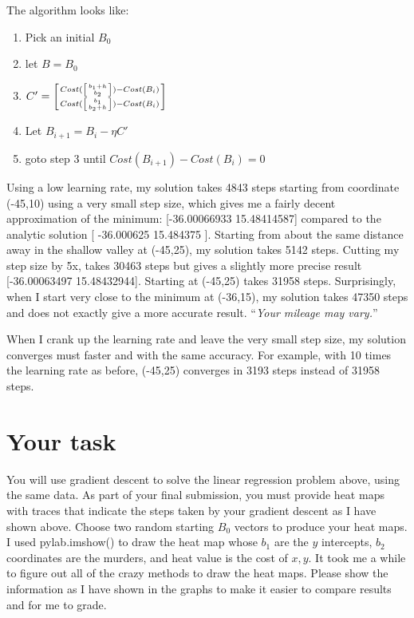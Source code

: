 \begin{fullwidth}
The algorithm looks like:

\begin{enumerate}
\item Pick an initial $B_0$
\item let $B = B_0$
\item $C' = \left[ Cost(\left[ b_1+h \above 0pt{b_2} \right]) - Cost(B_i) \above 0pt Cost(\left[ b_1 \above 0pt{b_2+h} \right]) - Cost(B_i) \right]$
\item Let $B_{i+1} = B_i - \eta C'$
\item goto step 3 until $Cost(B_{i+1})-Cost(B_i)=0$
\end{enumerate}

Using a low learning rate, my solution takes 4843 steps starting from coordinate (-45,10) using a very small step size, which gives me a fairly decent approximation of the minimum: [-36.00066933  15.48414587] compared to the analytic solution [ -36.000625 15.484375 ]. Starting from about the same distance away in the shallow valley at (-45,25), my solution takes 5142 steps. Cutting my step size by 5x, takes 30463 steps but gives a slightly more precise result [-36.00063497  15.48432944]. Starting at (-45,25) takes 31958 steps. Surprisingly, when I start very close to the minimum at (-36,15), my solution takes 47350 steps and does not exactly give a more accurate result. ``{\em Your mileage may vary.}''

\noindent {}

\noindent {}

When I crank up the learning rate and leave the very small step size, my solution converges must faster and with the same accuracy. For example, with 10 times the learning rate as before, (-45,25) converges in 3193 steps instead of 31958 steps.

\section{Your task}

You will use gradient descent to solve the linear regression problem above, using the same data. As part of your final submission, you must provide heat maps with traces that indicate the steps taken by your gradient descent as I have shown above. Choose two random starting $B_0$ vectors to produce your heat maps. I used pylab.imshow() to draw the heat map whose $b_1$ are the $y$ intercepts, $b_2$ coordinates are the murders, and heat value is the cost of $x,y$.  It took me a while to figure out all of the crazy methods to draw the heat maps. Please show the information as I have shown in the graphs to make it easier to compare results and for me to grade.


\end{fullwidth}
